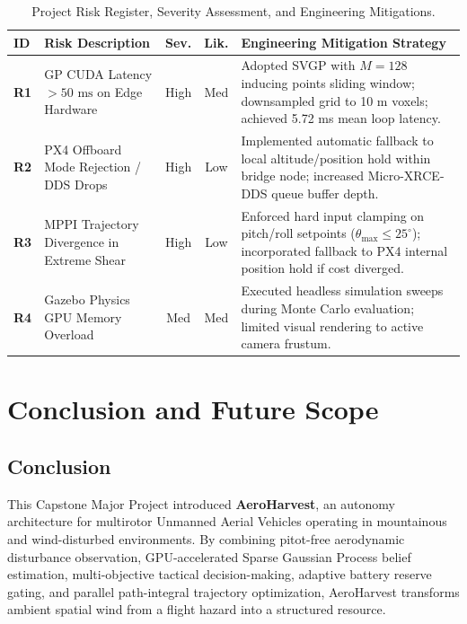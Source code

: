 \documentclass[12pt,a4paper,oneside]{report}
\begin{document}
\begin{table}[H]
    \centering
    \small
    \caption{Project Risk Register, Severity Assessment, and Engineering Mitigations.}
    \label{tab:risks}
    \begin{tabularx}{\linewidth}{p{1.2cm}p{4.2cm}ccX}
        \toprule
        \textbf{ID} & \textbf{Risk Description} & \textbf{Sev.} & \textbf{Lik.} & \textbf{Engineering Mitigation Strategy} \\
        \midrule
        \textbf{R1} & GP CUDA Latency $> 50\text{ ms}$ on Edge Hardware & High & Med & Adopted SVGP with $M=128$ inducing points sliding window; downsampled grid to 10 m voxels; achieved 5.72 ms mean loop latency. \\
        \textbf{R2} & PX4 Offboard Mode Rejection / DDS Drops & High & Low & Implemented automatic fallback to local altitude/position hold within bridge node; increased Micro-XRCE-DDS queue buffer depth. \\
        \textbf{R3} & MPPI Trajectory Divergence in Extreme Shear & High & Low & Enforced hard input clamping on pitch/roll setpoints ($\theta_{\text{max}} \le 25^\circ$); incorporated fallback to PX4 internal position hold if cost diverged. \\
        \textbf{R4} & Gazebo Physics GPU Memory Overload & Med & Med & Executed headless simulation sweeps during Monte Carlo evaluation; limited visual rendering to active camera frustum. \\
        \bottomrule
    \end{tabularx}
\end{table}

\chapter{Conclusion and Future Scope}

\section{Conclusion}
This Capstone Major Project introduced \textbf{AeroHarvest}, an autonomy architecture for multirotor Unmanned Aerial Vehicles operating in mountainous and wind-disturbed environments. By combining pitot-free aerodynamic disturbance observation, GPU-accelerated Sparse Gaussian Process belief estimation, multi-objective tactical decision-making, adaptive battery reserve gating, and parallel path-integral trajectory optimization, AeroHarvest transforms ambient spatial wind from a flight hazard into a structured resource.
\end{document}
